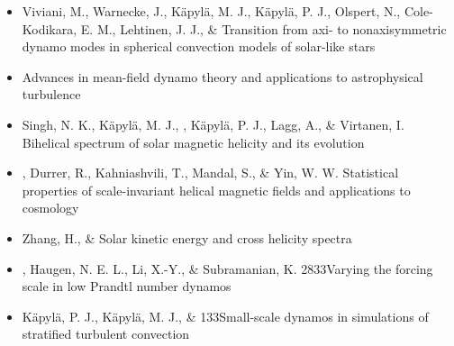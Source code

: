 \begin{itemize}
\item[{372.}~]
Viviani, M., Warnecke, J., K\"apyl\"a, M. J., K\"apyl\"a, P. J., Olspert, N., Cole-Kodikara, E. M., Lehtinen, J. J., \& \Brandenburg{}
{Transition from axi- to nonaxisymmetric dynamo modes in spherical convection models of solar-like stars}

\item[{371.}~]
\Brandenburg{}
{Advances in mean-field dynamo theory and applications to astrophysical turbulence}

\item[{370.}~]
Singh, N. K., K\"apyl\"a, M. J., \Brandenburg, K\"apyl\"a, P. J., Lagg, A., \& Virtanen, I.
{Bihelical spectrum of solar magnetic helicity and its evolution}

\item[{369.}~]
\Brandenburg, Durrer, R., Kahniashvili, T., Mandal, S., \& Yin, W. W.
{Statistical properties of scale-invariant helical magnetic fields and applications to cosmology}

\item[{368.}~]
Zhang, H., \& \Brandenburg{}
{Solar kinetic energy and cross helicity spectra}

\item[{367.}~]
\Brandenburg, Haugen, N. E. L., Li, X.-Y., \& Subramanian, K.
{2833}{Varying the forcing scale in low Prandtl number dynamos}

\item[{366.}~]
K\"apyl\"a, P. J., K\"apyl\"a, M. J., \& \Brandenburg{}
{133}{Small-scale dynamos in simulations of stratified turbulent convection}


\end{itemize}

